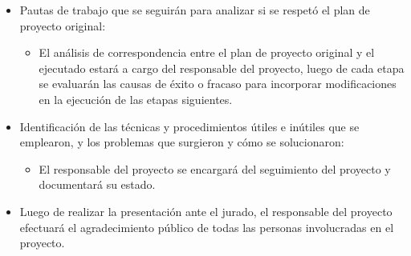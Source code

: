 \documentclass[
11pt%
]{charter}
\begin{document}
\begin{itemize}
	\item Pautas de trabajo que se seguirán para analizar si se respetó el plan de proyecto original:\\
	\begin{itemize}
	 \item El análisis de correspondencia entre el plan de proyecto original y el ejecutado estará a cargo del responsable del proyecto, luego de cada etapa se evaluarán las causas de éxito o fracaso para incorporar modificaciones en la ejecución de las etapas siguientes.
	 \end{itemize}
	\item Identificación de las técnicas y procedimientos útiles e inútiles que se emplearon, y los problemas que surgieron y cómo se solucionaron:
	\begin{itemize}
	 \item El responsable del proyecto se encargará del seguimiento del proyecto y documentará su estado.
	 \end{itemize}
	\item Luego de realizar la presentación ante el jurado, el responsable del proyecto efectuará el agradecimiento público de todas las personas involucradas en el proyecto.
\end{itemize}
\end{document}
